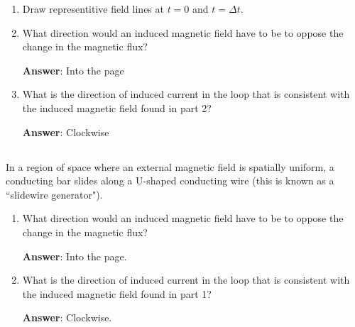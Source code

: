 \documentclass{article}
\begin{document}
\begin{enumerate}

  \item Draw representitive field lines at $t=0$ and $t=\Delta t$.

        \ifsolutions

        \else

        
        \fi

  \item What direction would an induced magnetic field have to be to oppose the change in the magnetic flux?

        \ifsolutions
        {\bf Answer}: Into the page
        \else

        \fi

  \item What is the direction of induced current in the loop that is consistent with the induced magnetic field found in part 2?

        \ifsolutions
        {\bf Answer}: Clockwise
        \else
        \fi

\end{enumerate}

\subsection{}

In a region of space where an external magnetic field is spatially uniform, a conducting bar slides along a U-shaped conducting wire (this is known as a ``slidewire generator").



\begin{enumerate}

  \item What direction would an induced magnetic field have to be to oppose the change in the magnetic flux?

        \ifsolutions
        {\bf Answer}: Into the page.
        \else

        \fi

  \item What is the direction of induced current in the loop that is consistent with the induced magnetic field found in part 1?

        \ifsolutions
        {\bf Answer}: Clockwise.
        \else

        \fi

\end{enumerate}
\end{document}
